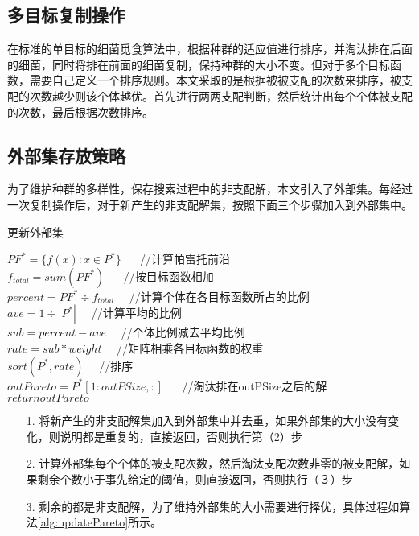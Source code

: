     \subsection{多目标复制操作}
    在标准的单目标的细菌觅食算法中，根据种群的适应值进行排序，并淘汰排在后面的细菌，同时将排在前面的细菌复制，保持种群的大小不变。但对于多个目标函数，需要自己定义一个排序规则。本文采取的是根据被被支配的次数来排序，被支配的次数越少则该个体越优。首先进行两两支配判断，然后统计出每个个体被支配的次数，最后根据次数排序。

    \subsection{外部集存放策略}
    为了维护种群的多样性，保存搜索过程中的非支配解，本文引入了外部集。每经过一次复制操作后，对于新产生的非支配解集，按照下面三个步骤加入到外部集中。
    \begin{algorithm}[htbp]
        \caption{更新外部集} \label{alg:updatePareto}
        $PF^*= \{f(x):x\in P^*\}$ 　 //计算帕雷托前沿 \\
        $f_{total} = sum(PF^*)$  　 //按目标函数相加\\
        $percent = PF^* \div　f_{total} $　 //计算个体在各目标函数所占的比例\\
        $ave = 1 \div |P^*|$　 //计算平均的比例\\
        $sub = percent - ave$　 //个体比例减去平均比例 \\
        $rate = sub \ast weight$　 //矩阵相乘各目标函数的权重\\
        $sort(P^*, rate)$　 //排序\\
        $outPareto = P^*[1:outPSize,:]$ 　 //淘汰排在outPSize之后的解\\
        $return outPareto$
    \end{algorithm}
    \begin{enumerate}
       \item[1.] 将新产生的非支配解集加入到外部集中并去重，如果外部集的大小没有变化，则说明都是重复的，直接返回，否则执行第（2）步
       \item[2.] 计算外部集每个个体的被支配次数，然后淘汰支配次数非零的被支配解，如果剩余个数小于事先给定的阈值，则直接返回，否则执行（３）步
       \item[3.] 剩余的都是非支配解，为了维持外部集的大小需要进行择优，具体过程如算法\ref{alg:updatePareto}所示。
    \end{enumerate} 
